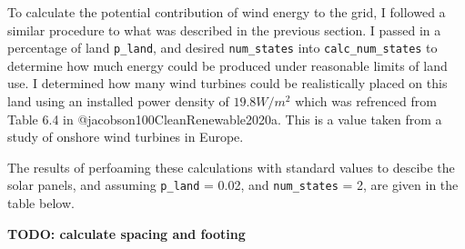 \documentclass{scrartcl}
\begin{document}
To calculate the potential contribution of wind energy to the grid, I
followed a similar procedure to what was described in the previous
section. I passed in a percentage of land \texttt{p\_land}, and desired
\texttt{num\_states} into \texttt{calc\_num\_states} to determine how
much energy could be produced under reasonable limits of land use. I
determined how many wind turbines could be realistically placed on this
land using an installed power density of \(19.8 \si{W/m^2}\) which was
refrenced from Table 6.4 in @jacobson100CleanRenewable2020a. This is a
value taken from a study of onshore wind turbines in Europe.

The results of perfoaming these calculations with standard values to
descibe the solar panels, and assuming \texttt{p\_land} = 0.02, and
\texttt{num\_states} = 2, are given in the table below.

\textbf{TODO: calculate spacing and footing}
\end{document}
